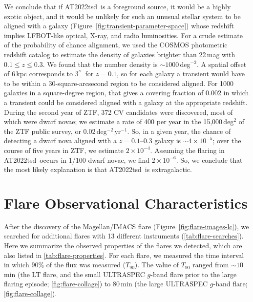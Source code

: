 \documentclass{nature_plusfigure}
\newcommand{\at}{AT2022tsd}
\newcommand{\arcsec}{$^{\prime\prime}$}
\begin{document}
\begin{methods}
We conclude that if \at\ is a foreground source, it would be a highly exotic object, and it would be unlikely for such an unusual stellar system to be aligned with a galaxy (Figure~\ref{fig:transient-parameter-space}) whose redshift implies LFBOT-like optical, X-ray, and radio luminosities.
For a crude estimate of the probability of chance alignment, we used the COSMOS photometric redshift catalog\cite{Ilbert2008} to estimate the density of galaxies brighter than 22\,mag with $0.1 \leq z \leq 0.3$. We found that the number density is $\sim 1000$\,deg$^{-2}$.
A spatial offset of 6\,kpc corresponds to 3\arcsec\ for $z=0.1$, so for each galaxy a transient would have to be within a 30-square-arcsecond region to be considered aligned. For 1000 galaxies in a square-degree region, that gives a covering fraction of 0.002 in which a transient could be considered aligned with a galaxy at the appropriate redshift.
During the second year of ZTF, 372 CV candidates were discovered\cite{Szkody2021}, most of which were dwarf novae; we estimate a rate of 400 per year in the 15,000\,deg$^{2}$ of the ZTF public survey, or 0.02\,deg$^{-2}$\,yr$^{-1}$. So, in a given year, the chance of detecting a dwarf nova aligned with a $z=0.1$--0.3 galaxy is $\sim 4\times10^{-5}$; over the course of five years in ZTF, we estimate $2\times10^{-4}$. Assuming the flaring in \at\ occurs in 1/100 dwarf novae, we find $2\times10^{-6}$.
So, we conclude that the most likely explanation is that \at\ is extragalactic.

\section{Flare Observational Characteristics}
\label{sec:flare-characteristics}

After the discovery of the Magellan/IMACS flare (Figure~\ref{fig:flare-images-lc}), we searched for additional flares with 13 different instruments (\ref{tab:flare-searches}). Here we summarize the observed properties of the flares we detected, which are also listed in \ref{tab:flare-properties}. For each flare, we measured the time interval in which 90\% of the flux was measured ($T_{90}$). The value of $T_{90}$ ranged from $\sim10$\,min (the LT flare, and the small ULTRASPEC $g$-band flare prior to the large flaring episode; \ref{fig:flare-collage}) to 80\,min (the large ULTRASPEC $g$-band flare; \ref{fig:flare-collage}). 


\end{methods}
\end{document}
